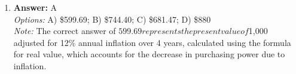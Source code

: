 \documentclass[12pt]{article}
\begin{document}
\begin{enumerate}[label=\arabic*.]
\\ \textit{Note:} The correct answer reflects the neoclassical view that individuals prefer to consume goods and services sooner rather than later, leading to the notion that interest serves as a compensation for delaying consumption, effectively acting as a penalty for those who choose to consume immediately.
\item \textbf{Answer:} A
\\ \textit{Options:} A) \$599.69; B) \$744.40; C) \$681.47; D) \$880
\\ \textit{Note:} The correct answer of $599.69 represents the present value of $1,000 adjusted for 12\% annual inflation over 4 years, calculated using the formula for real value, which accounts for the decrease in purchasing power due to inflation.
\end{enumerate}
\end{document}

